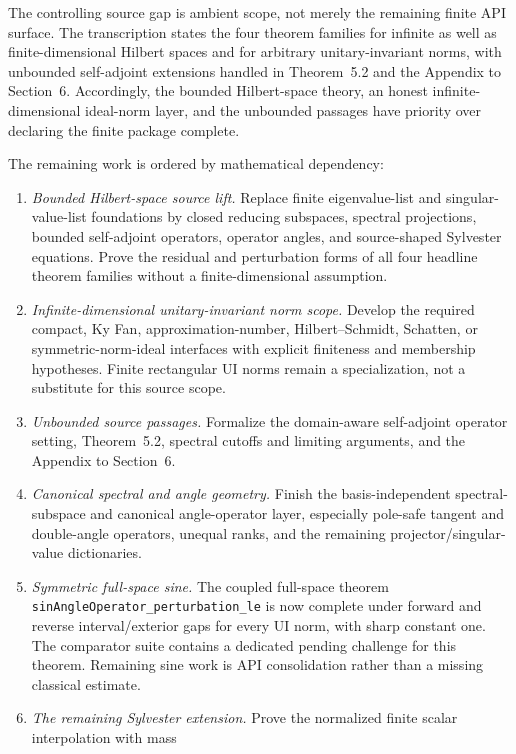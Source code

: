 \documentclass[11pt]{article}
\theoremstyle{remark}
\begin{document}
The controlling source gap is ambient scope, not merely the remaining finite
API surface.  The transcription states the four theorem families for infinite
as well as finite-dimensional Hilbert spaces and for arbitrary
unitary-invariant norms, with unbounded self-adjoint extensions handled in
Theorem~5.2 and the Appendix to Section~6.  Accordingly, the bounded
Hilbert-space theory, an honest infinite-dimensional ideal-norm layer, and the
unbounded passages have priority over declaring the finite package complete.

The remaining work is ordered by mathematical dependency:

\begin{enumerate}
\item \emph{Bounded Hilbert-space source lift.}
  Replace finite eigenvalue-list and singular-value-list foundations by closed
  reducing subspaces, spectral projections, bounded self-adjoint operators,
  operator angles, and source-shaped Sylvester equations.  Prove the residual
  and perturbation forms of all four headline theorem families without a
  finite-dimensional assumption.
\item \emph{Infinite-dimensional unitary-invariant norm scope.}
  Develop the required compact, Ky Fan, approximation-number, Hilbert--Schmidt,
  Schatten, or symmetric-norm-ideal interfaces with explicit finiteness and
  membership hypotheses.  Finite rectangular UI norms remain a specialization,
  not a substitute for this source scope.
\item \emph{Unbounded source passages.}
  Formalize the domain-aware self-adjoint operator setting, Theorem~5.2,
  spectral cutoffs and limiting arguments, and the Appendix to Section~6.
\item \emph{Canonical spectral and angle geometry.}
  Finish the basis-independent spectral-subspace and canonical angle-operator
  layer, especially pole-safe tangent and double-angle operators, unequal
  ranks, and the remaining projector/singular-value dictionaries.
\item \emph{Symmetric full-space sine.}
  The coupled full-space theorem
  \texttt{sinAngleOperator\_perturbation\_le} is now complete under forward
  and reverse interval/exterior gaps for every UI norm, with sharp constant
  one.  The comparator suite contains a dedicated pending challenge for this
  theorem.  Remaining sine work is API consolidation rather than a missing
  classical estimate.
\item \emph{The remaining Sylvester extension.}
  Prove the normalized finite scalar interpolation with mass

\end{enumerate}
\end{document}
